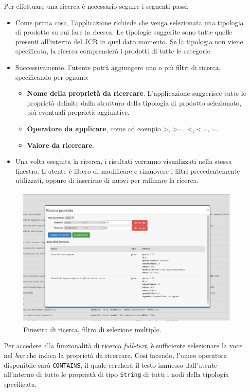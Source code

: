 		Per effettuare una ricerca è necessario seguire i seguenti passi:
		\begin{itemize}
			\item Come prima cosa, l'applicazione richiede che venga selezionata una tipologia di prodotto su cui fare la ricerca. Le tipologie suggerite sono tutte quelle presenti all'interno del JCR in quel dato momento. Se la tipologia non viene specificata, la ricerca comprenderà i prodotti di tutte le categorie.  
			\item Successivamente, l'utente potrà aggiungere uno o più filtri di ricerca, specificando per ognuno:
				\begin{itemize}
					\item \textbf{Nome della proprietà da ricercare}. L'applicazione suggerisce tutte le proprietà definite dalla struttura della tipologia di prodotto selezionato, più eventuali proprietà aggiuntive.
					\item \textbf{Operatore da applicare}, come ad esempio >, >=, <, <=, =.
					\item \textbf{Valore da ricercare}.
				\end{itemize}	
			\item Una volta eseguita la ricerca, i risultati verranno visualizzati nella stessa finestra. L'utente è libero di modificare e rimuovere i filtri precedentemente utilizzati, oppure di inserirne di nuovi per raffinare la ricerca. 	
		\end{itemize}
		
		\begin{figure}[H]
			\centering
			\includegraphics[height=7.1cm, width=\textwidth]{immagini/query-page-doppio}
			\caption{Finestra di ricerca, filtro di selezione multiplo.}
		\end{figure}
	
		Per accedere alla funzionalità di ricerca \textit{full-text}, è sufficiente selezionare la voce  nel \textit{box} che indica la proprietà da ricercare. Così facendo, l'unico operatore disponibile sarà \texttt{CONTAINS}, il quale cercherà il testo immesso dall'utente all'interno di tutte le proprietà di tipo \texttt{String} di tutti i nodi della tipologia specificata.
		

